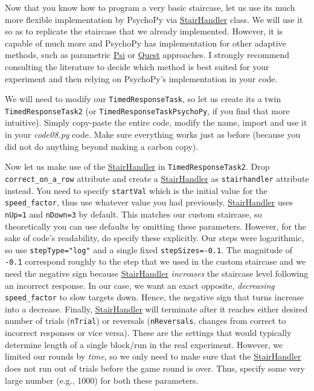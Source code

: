\documentclass[
]{book}
\begin{document}
Now that you know how to program a very basic staircase, let us use its much more flexible implementation by PsychoPy via \href{https://psychopy.org/api/data.html\#stairhandler}{StairHandler} class. We will use it so as to replicate the staircase that we already implemented. However, it is capable of much more and PsychoPy has implementation for other adaptive methods, such as parametric \href{https://psychopy.org/api/data.html\#psychopy.data.PsiHandler}{Psi} or \href{https://psychopy.org/api/data.html\#questhandler}{Quest} approaches. I strongly recommend consulting the literature to decide which method is best suited for your experiment and then relying on PsychoPy's implementation in your code.

We will need to modify our \texttt{TimedResponseTask}, so let us create its a twin \texttt{TimedResponseTask2} (or \texttt{TimedResponseTaskPsychoPy}, if you find that more intuitive). Simply copy-paste the entire code, modify the name, import and use it in your \emph{code08.py} code. Make sure everything works just as before (because you did not do anything beyond making a carbon copy).

Now let us make use of the \href{https://psychopy.org/api/data.html\#stairhandler}{StairHandler} in \texttt{TimedResponseTask2}. Drop \texttt{correct\_on\_a\_row} attribute and create a \href{https://psychopy.org/api/data.html\#stairhandler}{StairHandler} as \texttt{stairhandler} attribute instead. You need to specify \texttt{startVal} which is the initial value for the \texttt{speed\_factor}, thus use whatever value you had previously. \href{https://psychopy.org/api/data.html\#stairhandler}{StairHandler} uses \texttt{nUp=1} and \texttt{nDown=3} by default. This matches our custom staircase, so theoretically you can use defaults by omitting these parameters. However, for the sake of code's readability, do specify these explicitly. Our steps were logarithmic, so use \texttt{stepType="log"} and a single fixed \texttt{stepSizes=-0.1}. The magnitude of \texttt{-0.1} correspond roughly to the step that we used in the custom staircase and we need the negative sign because \href{https://psychopy.org/api/data.html\#stairhandler}{StairHandler} \emph{increases} the staircase level following an incorrect response. In our case, we want an exact opposite, \emph{decreasing} \texttt{speed\_factor} to slow targets down. Hence, the negative sign that turns increase into a decrease. Finally, \href{https://psychopy.org/api/data.html\#stairhandler}{StairHandler} will terminate after it reaches either desired number of trials (\texttt{nTrial}) or reversals (\texttt{nReversals}, changes from correct to incorrect responses or vice versa). These are the settings that would typically determine length of a single block/run in the real experiment. However, we limited our rounds by \emph{time}, so we only need to make sure that the \href{https://psychopy.org/api/data.html\#stairhandler}{StairHandler} does not run out of trials before the game round is over. Thus, specify some very large number (e.g., 1000) for both these parameters.
\end{document}
